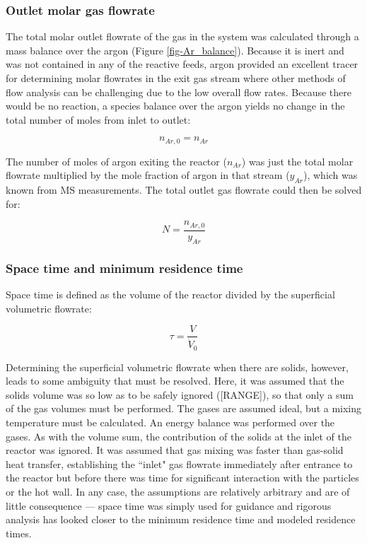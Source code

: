 \documentclass[11pt,twocolumn]{article}
\begin{document}
\subsubsection*{Outlet molar gas flowrate}

The total molar outlet flowrate of the gas in the system was calculated through a mass balance over the argon (Figure \ref{fig-Ar_balance}).  Because it is inert and was not contained in any of the reactive feeds, argon provided an excellent tracer for determining molar flowrates in the exit gas stream where other methods of flow analysis can be challenging due to the low overall flow rates.  Because there would be no reaction, a species balance over the argon yields no change in the total number of moles from inlet to outlet:

\begin{equation}
	n_{Ar,0} = n_{Ar}
\end{equation}

The number of moles of argon exiting the reactor ($n_{Ar}$) was just the total molar flowrate multiplied by the mole fraction of argon in that stream ($y_{Ar}$), which was known from MS measurements.  The total outlet gas flowrate could then be solved for:

\begin{equation}
	N = \frac{n_{Ar,0}}{y_{Ar}}
\end{equation}

\subsubsection*{Space time and minimum residence time}
Space time is defined as the volume of the reactor divided by the superficial volumetric flowrate:

\begin{equation}
	\tau = \frac{V}{\dot{V}_{0}}
\end{equation}

Determining the superficial volumetric flowrate when there are solids, however, leads to some ambiguity that must be resolved.  Here, it was assumed that the solids volume was so low as to be safely ignored ([RANGE]), so that only a sum of the gas volumes must be performed.  The gases are assumed ideal, but a mixing temperature must be calculated.  An energy balance was performed over the gases.  As with the volume sum, the contribution of the solids at the inlet of the reactor was ignored.  It was assumed that gas mixing was faster than gas-solid heat transfer, establishing the ``inlet" gas flowrate immediately after entrance to the reactor but before there was time for significant interaction with the particles or the hot wall.  In any case, the assumptions are relatively arbitrary and are of little consequence --- space time was simply used for guidance and rigorous analysis has looked closer to the minimum residence time and modeled residence times.
\end{document}
